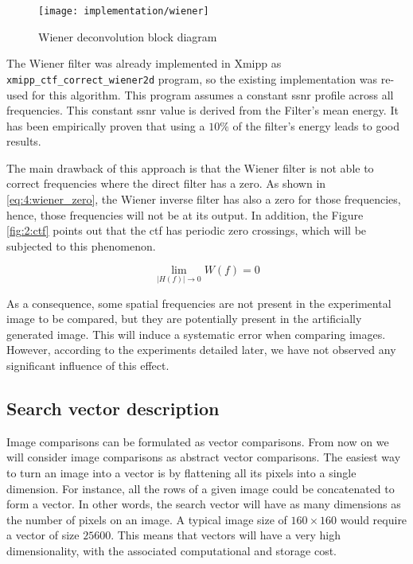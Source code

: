 \documentclass[../main.tex]{subfiles}
\begin{document}
\begin{figure}[htbp]
    \centering
    \texttt{[image: implementation/wiener]}
    \caption{Wiener deconvolution block diagram}
    \label{fig:4:wiener_block}
\end{figure}

The Wiener filter was already implemented in Xmipp\cite{sorzano2004} as \texttt{xmipp\_ctf\_correct\_wiener2d} program, so the existing implementation was re-used for this algorithm. This program assumes a constant \gls{ssnr} profile across all frequencies. This constant \gls{ssnr} value is derived from the Filter's mean energy. It has been empirically proven that using a $10\si{\percent}$ of the filter's energy leads to good results\cite{grigorieff2017}.

The main drawback of this approach is that the Wiener filter is not able to correct frequencies where the direct filter has a zero. As shown in \eqref{eq:4:wiener_zero}, the Wiener inverse filter has also a zero for those frequencies, hence, those frequencies will not be at its output. In addition, the Figure \ref{fig:2:ctf} points out that the \gls{ctf} has periodic zero crossings, which will be subjected to this phenomenon.

\begin{equation}\label{eq:4:wiener_zero}
    \lim_{\left\vert H(f) \right\vert \rightarrow 0} W(f) = 0
\end{equation} 

As a consequence, some spatial frequencies are not present in the experimental image to be compared, but they are potentially present in the artificially generated image. This will induce a systematic error when comparing images. However, according to the experiments detailed later, we have not observed any significant influence of this effect. 

\subsection{Search vector description}
Image comparisons can be formulated as vector comparisons. From now on we will consider image comparisons as abstract vector comparisons. The easiest way to turn an image into a vector is by flattening all its pixels into a single dimension. For instance, all the rows of a given image could be concatenated to form a vector. In other words, the search vector will have as many dimensions as the number of pixels on an image. A typical image size of $160\times160$ would require a vector of size $25600$. This means that vectors will have a very high dimensionality, with the associated computational and storage cost.
\end{document}
